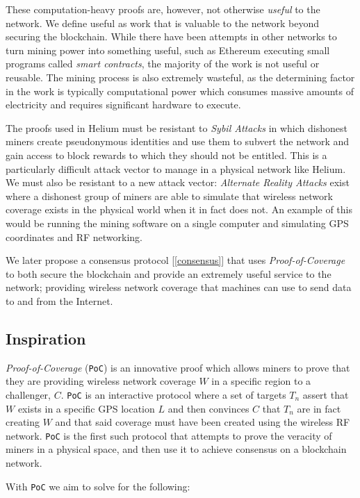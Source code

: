 \documentclass[10pt, nonatbib, nocopyrightspace, reprint]{sigplanconf}
\newcommand{\secref}[1]{[\autoref{#1}]}
\begin{document}
These computation-heavy proofs are, however, not otherwise \emph{useful} to the network. We define useful as work that is valuable to the network beyond securing the blockchain. While there have been attempts in other networks to turn mining power into something useful, such as Ethereum executing small programs called \emph{smart contracts}, the majority of the work is not useful or reusable. The mining process is also extremely wasteful, as the determining factor in the work is typically computational power which consumes massive amounts of electricity and requires significant hardware to execute.

The proofs used in Helium must be resistant to \emph{Sybil Attacks} in which dishonest miners create pseudonymous identities and use them to subvert the network and gain access to block rewards to which they should not be entitled. This is a particularly difficult attack vector to manage in a physical network like Helium. We must also be resistant to a new attack vector: \emph{Alternate Reality Attacks} exist where a dishonest group of miners are able to simulate that wireless network coverage exists in the physical world when it in fact does not. An example of this would be running the mining software on a single computer and simulating GPS coordinates and RF networking.

We later propose a consensus protocol \secref{consensus} that uses \emph{Proof-of-Coverage} to both secure the blockchain and provide an extremely useful service to the network; providing wireless network coverage that machines can use to send data to and from the Internet.

\subsection{Inspiration}

\emph{Proof-of-Coverage} (\verb|PoC|) is an innovative proof which allows miners to prove that they are providing wireless network coverage $W$ in a specific region to a challenger, $C$. \verb|PoC| is an interactive protocol where a set of targets $T_n$ assert that $W$ exists in a specific GPS location $L$ and then convinces $C$ that $T_n$ are in fact creating $W$ and that said coverage must have been created using the wireless RF network. \verb|PoC| is the first such protocol that attempts to prove the veracity of miners in a physical space, and then use it to achieve consensus on a blockchain network.

With \verb|PoC| we aim to solve for the following:
\end{document}

